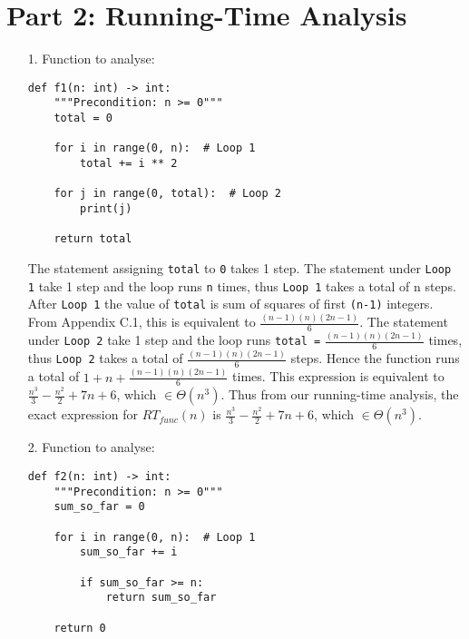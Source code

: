 \documentclass[11pt]{article}
\begin{document}
\newpage


\section*{Part 2: Running-Time Analysis}

\begin{enumerate}
\item[1.]
Function to analyse:

\begin{verbatim}
def f1(n: int) -> int:
    """Precondition: n >= 0"""
    total = 0

    for i in range(0, n):  # Loop 1
        total += i ** 2

    for j in range(0, total):  # Loop 2
        print(j)

    return total
\end{verbatim}

The statement assigning \texttt{total} to \texttt{0} takes 1 step. The statement under \texttt{Loop 1} take 1 step and the loop runs \texttt{n} times, thus \texttt{Loop 1} takes a total of n steps. After \texttt{Loop 1} the value of \texttt{total} is sum of squares of first \texttt{(n-1)} integers. From Appendix C.1, this is equivalent to $\frac{(n-1)(n)(2n-1)}{6}$. The statement under \texttt{Loop 2} take 1 step and the loop runs \texttt{total =} $\frac{(n-1)(n)(2n-1)}{6}$ times, thus \texttt{Loop 2} takes a total of $\frac{(n-1)(n)(2n-1)}{6}$ steps. Hence the function runs a total of $1 + n + \frac{(n-1)(n)(2n-1)}{6}$ times. This expression is equivalent to $\frac{n^3}{3} - \frac{n^2}{2} + 7n + 6$, which $\in \Theta(n^3)$. Thus from our running-time analysis, the exact expression for $RT_{func}(n)$ is $\frac{n^3}{3} - \frac{n^2}{2} + 7n + 6$, which $\in \Theta(n^3)$.
\newpage


\item[2.]
Function to analyse:

\begin{verbatim}
def f2(n: int) -> int:
    """Precondition: n >= 0"""
    sum_so_far = 0

    for i in range(0, n):  # Loop 1
        sum_so_far += i

        if sum_so_far >= n:
            return sum_so_far

    return 0
\end{verbatim}


\end{enumerate}
\end{document}
